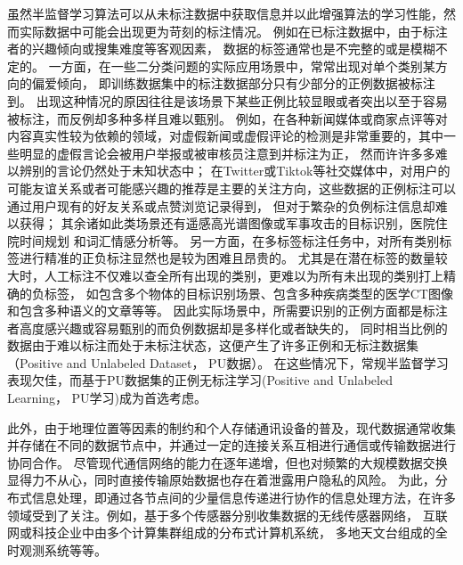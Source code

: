 虽然半监督学习算法可以从未标注数据中获取信息并以此增强算法的学习性能，然而实际数据中可能会出现更为苛刻的标注情况。
例如在已标注数据中，{由于标注者的兴趣倾向或搜集难度等客观因素}，
数据的标签通常也是不完整的或是模糊不定的\cite{Garg_PU_2021,Fang_Partial_2019}。
一方面，在一些二分类问题的实际应用场景中，常常出现对单个类别某方向的偏爱倾向，
{即训练数据集中的标注数据部分只有少部分的正例数据被标注到。}
出现这种情况的原因往往是该场景下某些正例比较显眼或者突出以至于容易被标注，而反例却多种多样且难以甄别。
例如，在各种新闻媒体或商家点评等对内容真实性较为依赖的领域，对虚假新闻或虚假评论的检测是非常重要的，其中一些明显的虚假言论会被用户举报或被审核员注意到并标注为正，
然而许许多多难以辨别的言论仍然处于未知状态中\cite{Hsieh_PUscnario1_2015}；
在Twitter或Tiktok等社交媒体中，对用户的可能友谊关系或者可能感兴趣的推荐是主要的关注方向，这些数据的正例标注可以通过用户现有的好友关系或点赞浏览记录得到，
但对于繁杂的负例标注信息却难以获得\cite{Jaskie_PUscnario3_2019}；
其余诸如此类场景还有遥感高光谱图像或军事攻击的目标识别\cite{Li_PUscnario2_2010}，医院住院时间规划\cite{Arjannikov_Empirical_2021}
和词汇情感分析\cite{Wang_Sentiment_2017}等。
另一方面，在多标签标注任务中，对所有类别标签进行精准的正负标注显然也是较为困难且昂贵的\cite{Deng_ML_2014}。
尤其是在潜在标签的数量较大时，人工标注不仅难以查全所有出现的类别，更难以为所有未出现的类别打上精确的负标签\cite{Cole_SML_2021}，
如包含多个物体的目标识别场景、包含多种疾病类型的医学CT图像\cite{Redmon_YOLO_2017}和包含多种语义的文章\cite{Kenton_BERT_2019}等等。
{因此实际场景中，所需要识别的正例方面都是标注者高度感兴趣或容易甄别的而负例数据却是多样化或者缺失的，
同时相当比例的数据由于难以标注而处于未标注状态，这便产生了许多正例和无标注数据集（Positive and Unlabeled Dataset， PU数据）。}
在这些情况下，常规半监督学习表现欠佳，而基于PU数据集的正例无标注学习(Positive and Unlabeled Learning， PU学习)成为首选考虑\cite{Fusilier_PU_2015}。

此外，由于地理位置等因素的制约和个人存储通讯设备的普及，现代数据通常收集并存储在不同的数据节点中，并通过一定的连接关系互相进行通信或传输数据进行协同合作\cite{廖文龙_分布式半监督_2021}。
尽管现代通信网络的能力在逐年递增，但也对频繁的大规模数据交换显得力不从心，{同时直接传输原始数据也存在着泄露用户隐私的风险。}
为此，分布式信息处理，即通过各节点间的少量信息传递进行协作的信息处理方法，在许多领域受到了关注。例如，基于多个传感器分别收集数据的无线传感器网络\cite{Hua_Distributed_2015,Zhang_Distributed_2021}，
互联网或科技企业中由多个计算集群组成的分布式计算机系统\cite{沈鹏程_分布式信息论_2016}，
多地天文台组成的全时观测系统\cite{FAST}等等。

